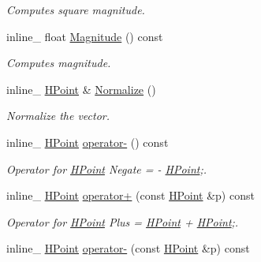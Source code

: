 \begin{DoxyCompactItemize}
\begin{DoxyCompactList}\small\item\em Computes square magnitude. \end{DoxyCompactList}\item 
\hypertarget{class_h_point_afd62312596b4f75efabd6c82367b7a1e}{inline\+\_\+ float \hyperlink{class_h_point_afd62312596b4f75efabd6c82367b7a1e}{Magnitude} () const }\label{class_h_point_afd62312596b4f75efabd6c82367b7a1e}

\begin{DoxyCompactList}\small\item\em Computes magnitude. \end{DoxyCompactList}\item 
\hypertarget{class_h_point_ae012e12b2f38ad990c9d7724bb35d513}{inline\+\_\+ \hyperlink{class_h_point}{H\+Point} \& \hyperlink{class_h_point_ae012e12b2f38ad990c9d7724bb35d513}{Normalize} ()}\label{class_h_point_ae012e12b2f38ad990c9d7724bb35d513}

\begin{DoxyCompactList}\small\item\em Normalize the vector. \end{DoxyCompactList}\item 
\hypertarget{class_h_point_a0f93fb7382849ac838c572914992e1ed}{inline\+\_\+ \hyperlink{class_h_point}{H\+Point} \hyperlink{class_h_point_a0f93fb7382849ac838c572914992e1ed}{operator-\/} () const }\label{class_h_point_a0f93fb7382849ac838c572914992e1ed}

\begin{DoxyCompactList}\small\item\em Operator for \hyperlink{class_h_point}{H\+Point} Negate = -\/ \hyperlink{class_h_point}{H\+Point};. \end{DoxyCompactList}\item 
\hypertarget{class_h_point_a0b8634cc8070cd006c4df38e3f865b13}{inline\+\_\+ \hyperlink{class_h_point}{H\+Point} \hyperlink{class_h_point_a0b8634cc8070cd006c4df38e3f865b13}{operator+} (const \hyperlink{class_h_point}{H\+Point} \&p) const }\label{class_h_point_a0b8634cc8070cd006c4df38e3f865b13}

\begin{DoxyCompactList}\small\item\em Operator for \hyperlink{class_h_point}{H\+Point} Plus = \hyperlink{class_h_point}{H\+Point} + \hyperlink{class_h_point}{H\+Point};. \end{DoxyCompactList}\item 
\hypertarget{class_h_point_a215c8588bce1b73c2ffe10eaa2e11806}{inline\+\_\+ \hyperlink{class_h_point}{H\+Point} \hyperlink{class_h_point_a215c8588bce1b73c2ffe10eaa2e11806}{operator-\/} (const \hyperlink{class_h_point}{H\+Point} \&p) const }\label{class_h_point_a215c8588bce1b73c2ffe10eaa2e11806}


\end{DoxyCompactItemize}

